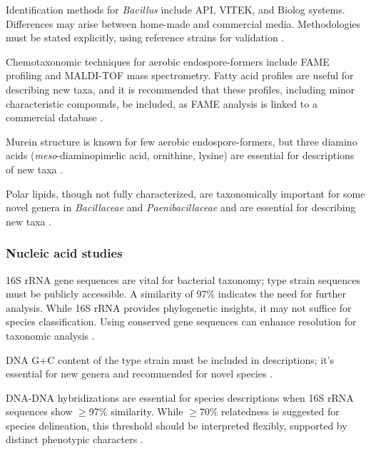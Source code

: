 Identification methods for \textit{Bacillus} include API, VITEK, and Biolog systems. Differences may arise between home-made and commercial media. Methodologies must be stated explicitly, using reference strains for validation \cite*{L10-PropMin}.

Chemotaxonomic techniques for aerobic endospore-formers include FAME profiling and MALDI-TOF mass spectrometry. Fatty acid profiles are useful for describing new taxa, and it is recommended that these profiles, including minor characteristic compounds, be included, as FAME analysis is linked to a commercial database \cite*{L10-PropMin}.

Murein structure is known for few aerobic endospore-formers, but three diamino acids (\textit{meso}-diaminopimelic acid, ornithine, lysine) are essential for descriptions of new taxa \cite*{L10-PropMin}.

Polar lipids, though not fully characterized, are taxonomically important for some novel genera in \textit{Bacillaceae} and \textit{Paenibacillaceae} and are essential for describing new taxa \cite*{L10-PropMin}.

\subsubsection{Nucleic acid studies}
16S rRNA gene sequences are vital for bacterial taxonomy; type strain sequences must be publicly accessible. A similarity of 97\% indicates the need for further analysis. While 16S rRNA provides phylogenetic insights, it may not suffice for species classification. Using conserved gene sequences can enhance resolution for taxonomic analysis \cite*{L10-PropMin}.

DNA G+C content of the type strain must be included in descriptions; it's essential for new genera and recommended for novel species \cite*{L10-PropMin}.

DNA-DNA hybridizations are essential for species descriptions when 16S rRNA sequences show $\geq$97\% similarity. While $\geq$70\% relatedness is suggested for species delineation, this threshold should be interpreted flexibly, supported by distinct phenotypic characters \cite*{L10-PropMin}.

